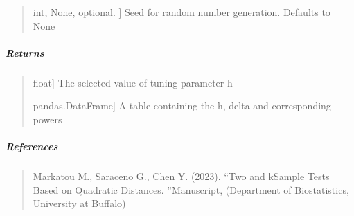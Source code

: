 \documentclass[letterpaper,10pt,english,openany,oneside]{sphinxmanual}
\begin{document}
\begin{fulllineitems}
\begin{quote}
\begin{description}
\sphinxlineitem{random\_state}{[}int, None, optional. {]}
\sphinxAtStartPar
Seed for random number generation. Defaults to None

\end{description}
\end{quote}


\subparagraph{Returns}
\label{\detokenize{api_reference/generated/QuadratiK.kernel_test.select_h:returns}}\begin{quote}
\begin{description}
\sphinxlineitem{h}{[}float{]}
\sphinxAtStartPar
The selected value of tuning parameter h

\sphinxlineitem{h vs Power table}{[}pandas.DataFrame{]}
\sphinxAtStartPar
A table containing the h, delta and corresponding powers

\end{description}
\end{quote}


\subparagraph{References}
\label{\detokenize{api_reference/generated/QuadratiK.kernel_test.select_h:references}}\begin{quote}

\sphinxAtStartPar
Markatou M., Saraceno G., Chen Y. (2023). “Two\sphinxhyphen{} and k\sphinxhyphen{}Sample Tests 
Based on Quadratic Distances. ”Manuscript, (Department of Biostatistics, 
University at Buffalo)
\end{quote}



\end{fulllineitems}
\end{document}
